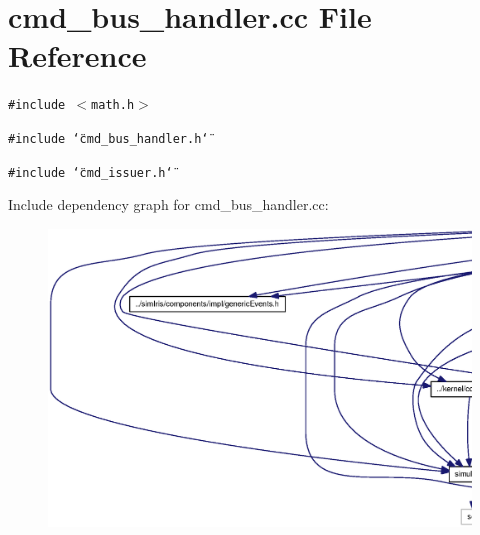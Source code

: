 \section{cmd\_\-bus\_\-handler.cc File Reference}
\label{cmd__bus__handler_8cc}
{\tt \#include $<$math.h$>$}\par
{\tt \#include \char`\"{}cmd\_\-bus\_\-handler.h\char`\"{}}\par
{\tt \#include \char`\"{}cmd\_\-issuer.h\char`\"{}}\par


Include dependency graph for cmd\_\-bus\_\-handler.cc:\nopagebreak
\begin{figure}[H]
\begin{center}
\leavevmode
\includegraphics[width=420pt]{cmd__bus__handler_8cc__incl}
\end{center}
\end{figure}
